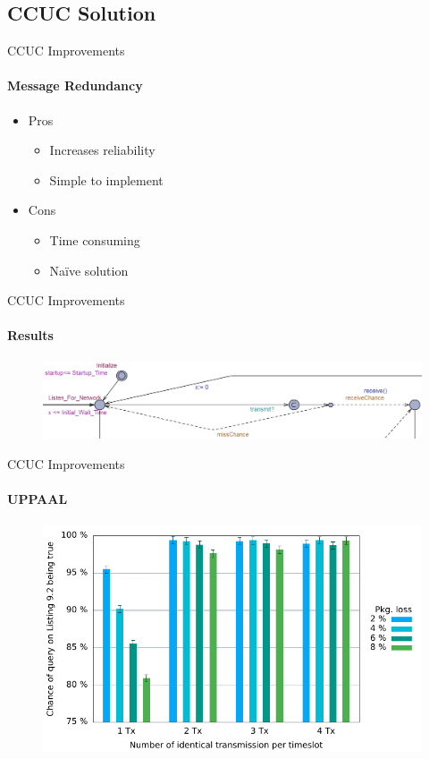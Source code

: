 \subsection{CCUC Solution}
\begin{frame}{CCUC Improvements}
\framesubtitle{Message Redundancy}

  \begin{itemize}
    \item Pros
      \begin{itemize}
    	\item Increases reliability
    	\item Simple to implement
  	  \end{itemize}
    \item Cons
      \begin{itemize}
    	\item Time consuming
    	\item Naïve solution
  	  \end{itemize}
  \end{itemize}
\end{frame}

\begin{frame}{CCUC Improvements}
\framesubtitle{Results}
\begin{figure}%
\centering
\includegraphics[width=1\textwidth]{images/ccuc.png} 
\end{figure}	
\end{frame}

\begin{frame}{CCUC Improvements}
\framesubtitle{UPPAAL}
\begin{figure}%
\centering
\includegraphics[width=1\textwidth]{images/graph2.pdf} 
\end{figure}
\end{frame}

